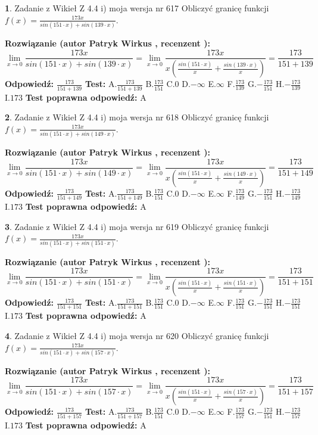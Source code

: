 \documentclass[12pt, a4paper]{article}
\theoremstyle{definition} %
\newtheorem{zad}{}
\newcommand{\zadStart}[1]{\begin{zad}#1\newline}
\newcommand{\zadStop}{\end{zad}}
\newcommand{\rozwStart}[2]{\noindent \textbf{Rozwiązanie (autor #1 , recenzent #2): }\newline}
\newcommand{\rozwStop}{\newline}
\newcommand{\odpStart}{\noindent \textbf{Odpowiedź:}\newline}
\newcommand{\odpStop}{\newline}
\newcommand{\testStart}{\noindent \textbf{Test:}\newline}
\newcommand{\testStop}{\newline}
\newcommand{\kluczStart}{\noindent \textbf{Test poprawna odpowiedź:}\newline}
\newcommand{\kluczStop}{\newline}
\begin{document}
\zadStart{Zadanie z Wikieł Z 4.4 i) moja wersja nr 617}
Obliczyć granicę funkcji $f(x)=\frac{173x}{sin(151\cdot x) +sin(139\cdot x)}$.
\zadStop
\rozwStart{Patryk Wirkus}{}
$$\lim\limits_{x\to 0}\frac{173x}{sin(151\cdot x) +sin(139\cdot x)}=\lim\limits_{x\to 0}\frac{173x}{x(\frac{sin(151\cdot x)}{x}+\frac{sin(139\cdot x)}{x})}=\frac{173}{151+139}$$
\rozwStop
\odpStart
$\frac{173}{151+139}$
\odpStop
\testStart
A.$\frac{173}{151+139}$
B.$\frac{173}{151}$
C.$0$
D.$-\infty$
E.$\infty$
F.$\frac{173}{139}$
G.$-\frac{173}{151}$
H.$-\frac{173}{139}$
I.$173$
\testStop
\kluczStart
A
\kluczStop



\zadStart{Zadanie z Wikieł Z 4.4 i) moja wersja nr 618}
Obliczyć granicę funkcji $f(x)=\frac{173x}{sin(151\cdot x) +sin(149\cdot x)}$.
\zadStop
\rozwStart{Patryk Wirkus}{}
$$\lim\limits_{x\to 0}\frac{173x}{sin(151\cdot x) +sin(149\cdot x)}=\lim\limits_{x\to 0}\frac{173x}{x(\frac{sin(151\cdot x)}{x}+\frac{sin(149\cdot x)}{x})}=\frac{173}{151+149}$$
\rozwStop
\odpStart
$\frac{173}{151+149}$
\odpStop
\testStart
A.$\frac{173}{151+149}$
B.$\frac{173}{151}$
C.$0$
D.$-\infty$
E.$\infty$
F.$\frac{173}{149}$
G.$-\frac{173}{151}$
H.$-\frac{173}{149}$
I.$173$
\testStop
\kluczStart
A
\kluczStop



\zadStart{Zadanie z Wikieł Z 4.4 i) moja wersja nr 619}
Obliczyć granicę funkcji $f(x)=\frac{173x}{sin(151\cdot x) +sin(151\cdot x)}$.
\zadStop
\rozwStart{Patryk Wirkus}{}
$$\lim\limits_{x\to 0}\frac{173x}{sin(151\cdot x) +sin(151\cdot x)}=\lim\limits_{x\to 0}\frac{173x}{x(\frac{sin(151\cdot x)}{x}+\frac{sin(151\cdot x)}{x})}=\frac{173}{151+151}$$
\rozwStop
\odpStart
$\frac{173}{151+151}$
\odpStop
\testStart
A.$\frac{173}{151+151}$
B.$\frac{173}{151}$
C.$0$
D.$-\infty$
E.$\infty$
F.$\frac{173}{151}$
G.$-\frac{173}{151}$
H.$-\frac{173}{151}$
I.$173$
\testStop
\kluczStart
A
\kluczStop



\zadStart{Zadanie z Wikieł Z 4.4 i) moja wersja nr 620}
Obliczyć granicę funkcji $f(x)=\frac{173x}{sin(151\cdot x) +sin(157\cdot x)}$.
\zadStop
\rozwStart{Patryk Wirkus}{}
$$\lim\limits_{x\to 0}\frac{173x}{sin(151\cdot x) +sin(157\cdot x)}=\lim\limits_{x\to 0}\frac{173x}{x(\frac{sin(151\cdot x)}{x}+\frac{sin(157\cdot x)}{x})}=\frac{173}{151+157}$$
\rozwStop
\odpStart
$\frac{173}{151+157}$
\odpStop
\testStart
A.$\frac{173}{151+157}$
B.$\frac{173}{151}$
C.$0$
D.$-\infty$
E.$\infty$
F.$\frac{173}{157}$
G.$-\frac{173}{151}$
H.$-\frac{173}{157}$
I.$173$
\testStop
\kluczStart
A
\kluczStop
\end{document}
